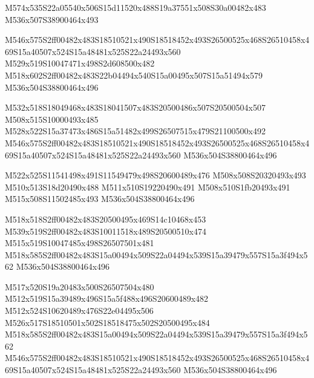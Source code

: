 \documentclass{article}
\begin{document}
\begin{multicols}{5}
\begin{center}
M574x535S22a05540x506S15d11520x488S19a37551x508S30a00482x483 %
M536x507S38900464x493 %

M546x575S2ff00482x483S18510521x490S18518452x493S26500525x468S26510458x469S15a40507x524S15a48481x525S22a24493x560 %
M529x519S10047471x498S2d608500x482 %
M518x602S2ff00482x483S22b04494x540S15a00495x507S15a51494x579 %
M536x504S38800464x496 %

M532x518S18049468x483S18041507x483S20500486x507S20500504x507 %
M508x515S10000493x485 %
M528x522S15a37473x486S15a51482x499S26507515x479S21100500x492 %
M546x575S2ff00482x483S18510521x490S18518452x493S26500525x468S26510458x469S15a40507x524S15a48481x525S22a24493x560 %
M536x504S38800464x496 %

M522x525S11541498x491S11549479x498S20600489x476 %
M508x508S20320493x493 %
M510x513S18d20490x488 %
M511x510S19220490x491 %
M508x510S1fb20493x491 %
M515x508S11502485x493 %
M536x504S38800464x496 %

M518x518S2ff00482x483S20500495x469S14c10468x453 %
M539x519S2ff00482x483S10011518x489S20500510x474 %
M515x519S10047485x498S26507501x481 %
M518x585S2ff00482x483S15a00494x509S22a04494x539S15a39479x557S15a3f494x562 %
M536x504S38800464x496 %

M517x520S19a20483x500S26507504x480 %
M512x519S15a39489x496S15a5f488x496S20600489x482 %
M512x524S10620489x476S22e04495x506 %
M526x517S18510501x502S18518475x502S20500495x484 %
M518x585S2ff00482x483S15a00494x509S22a04494x539S15a39479x557S15a3f494x562 %
M546x575S2ff00482x483S18510521x490S18518452x493S26500525x468S26510458x469S15a40507x524S15a48481x525S22a24493x560 %
M536x504S38800464x496 %

\end{center}
\end{multicols}
\end{document}
